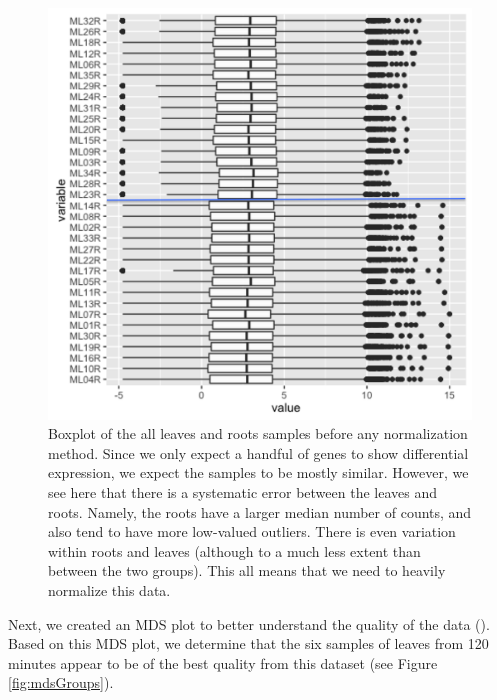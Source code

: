 \documentclass[11pt,a4paper,oldfontcommands,openany]{memoir}
\numberwithin{equation}{section} %
\begin{document}
\begin{figure}[H]
    \begin{framed}
    \centering
    \includegraphics[width=\textwidth]{needNorm}
    \end{framed}
    \caption{Boxplot of the all leaves and roots samples before any normalization method. Since we only expect a handful of genes to show differential expression, we expect the samples to be mostly similar. However, we see here that there is a systematic error between the leaves and roots. Namely, the roots have a larger median number of counts, and also tend to have more low-valued outliers. There is even variation within roots and leaves (although to a much less extent than between the two groups). This all means that we need to heavily normalize this data.}
    \label{fig:needNorm}
\end{figure}

Next, we created an MDS plot to better understand the quality of the data (\citealt{limma}). Based on this MDS plot, we determine that the six samples of leaves from 120 minutes appear to be of the best quality from this dataset (see Figure \ref{fig:mdsGroups}).
\end{document}
